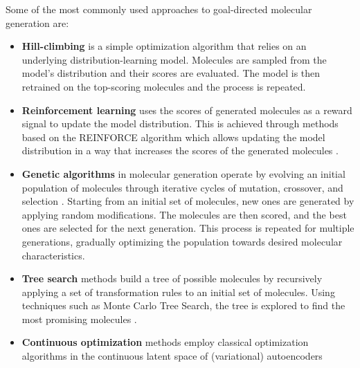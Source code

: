 Some of the most commonly used approaches to goal-directed molecular generation are:
\begin{itemize}
    \item \textbf{Hill-climbing}
          \citep{seglerGeneratingFocusedMolecule2018,xieMARSMarkovMolecular2021,thomasAugmentedHillClimbIncreases2022}
          is a simple optimization algorithm that relies on an underlying distribution-learning model.
          Molecules are sampled from the model's distribution and their scores are evaluated.
          The model is then retrained on the top-scoring molecules and the process is repeated.
    \item \textbf{Reinforcement learning} uses the scores of generated molecules as a reward signal to update
          the model distribution. This is achieved through methods based on the REINFORCE algorithm
          \citep{williamsSimpleStatisticalGradientfollowing1992} which allows updating the model
          distribution in a way that increases the scores of the generated molecules
          \citep{olivecronaMolecularDenovoDesign2017,thomasAugmentedHillClimbIncreases2022,youGraphConvolutionalPolicy2019,guoAugmentedMemoryCapitalizing2023}.
    \item \textbf{Genetic algorithms} in molecular generation operate by evolving an initial
          population of molecules through iterative cycles of mutation, crossover, and selection
          \citep{jensenGraphbasedGeneticAlgorithm2019,nigamGenerativeModelsSuperfast2021,yoshikawaPopulationbasedNovoMolecule2018}.
          Starting from an initial set of molecules, new ones are generated by applying
          random modifications. The molecules are then scored, and the best ones are
          selected for the next generation. This process is repeated for multiple generations,
          gradually optimizing the population towards desired molecular characteristics.
    \item \textbf{Tree search} methods build a tree of possible molecules by recursively applying a set of transformation rules
          to an initial set of molecules. Using techniques such as Monte Carlo Tree Search, the tree is
          explored to find the most promising molecules \citep{yangChemTSEfficientPython2017,jensenGraphbasedGeneticAlgorithm2019}.
    \item \textbf{Continuous optimization} methods employ classical optimization algorithms in the continuous
          latent space of (variational) autoencoders
          \citep{gomez-bombarelliAutomaticChemicalDesign2018,kusnerGrammarVariationalAutoencoder2017,winterEfficientMultiobjectiveMolecular2019}

\end{itemize}
